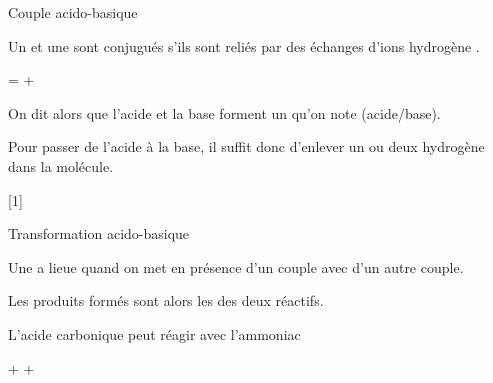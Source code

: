 \begin{doc}{Couple acido-basique}
  \begin{importants}
    Un  et une  sont conjugués s'ils sont reliés par des échanges d'ions hydrogène \ionHydrogene.
    \begin{center}
       =  + \ionHydrogene
    \end{center}
    On dit alors que l'acide et la base forment un  qu'on note  (acide/base).
  \end{importants}

  \attention Pour passer de l'acide à la base, il suffit donc d'enlever un ou deux hydrogène dans la molécule.
\end{doc}

[1]

\begin{doc}{Transformation acido-basique}
  \begin{importants}
    Une  a lieue quand on met en présence  d'un couple avec  d'un autre couple.

    Les produits formés sont alors les  des deux réactifs.
  \end{importants}

  \exemple L'acide carbonique \acideCarbonique peut réagir avec l'ammoniac \ammoniac
  \begin{center}
    \acideCarbonique + \ammoniac \reaction \bicarbonate + \ammonium
  \end{center}
\end{doc}

